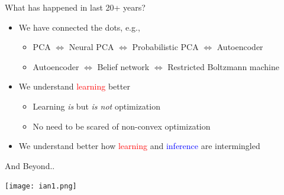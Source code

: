 \documentclass{beamer}
\newcommand{\tred}[1]{\textcolor{red}{#1}}
\newcommand{\tblue}[1]{\textcolor{blue}{#1}}
\begin{document}
\begin{frame}{What has happened in last 20+ years?}
    \begin{itemize}
        \item We have connected the dots, e.g.,
            \begin{itemize}
                \item PCA $\Leftrightarrow$ Neural PCA
                    $\Leftrightarrow$
                    Probabilistic PCA $\Leftrightarrow$ 
                    Autoencoder
                \item Autoencoder $\Leftrightarrow$ Belief
                    network $\Leftrightarrow$ Restricted
                    Boltzmann machine
            \end{itemize}
        \item We understand \tred{learning} better
            \begin{itemize}
                \item Learning \emph{is} but \emph{is not} optimization 
                \item No need to be scared of non-convex
                    optimization
            \end{itemize}
        \item We understand better how \tred{learning} and
            \tblue{inference} are intermingled
    \end{itemize}
\end{frame}


\begin{frame}{And Beyond..}

    \hspace*{-10.5mm}
    \texttt{[image: ian1.png]}

    
\end{frame}





\end{document}
